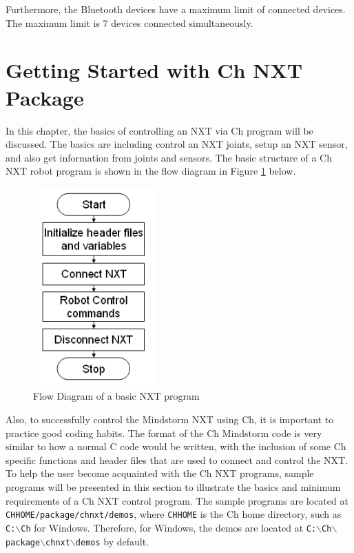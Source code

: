 \documentclass[11pt]{article}
\begin{document}
Furthermore, the Bluetooth devices have a maximum limit of connected devices. The maximum limit is 7 devices connected 
simultaneously.

\newpage
\section{Getting Started with Ch NXT Package}
In this chapter, the basics of controlling an NXT via Ch program will be discussed. The basics are including
control an NXT joints, setup an NXT sensor, and also get information from joints and sensors. The basic structure 
of a Ch NXT robot program is shown in the flow diagram in Figure \ref{fig_NXT_pstruc} below.\\

\begin{figure}[h!]
  \begin{center}
    \includegraphics[height=3in]{figure/mindstorm/NXT_pstruc.png}
    \caption{Flow Diagram of a basic NXT program\label{fig_NXT_pstruc}}
  \end{center}
\end{figure}

Also, to successfully control the Mindstorm NXT using Ch, it is important to practice good coding habits. 
The format of the Ch Mindstorm code is very similar to how a normal C code would be written, with the
inclusion of some Ch specific functions and header files that are used to connect and control the NXT. To 
help the user become acquainted with the Ch NXT programs, sample programs will be presented in this 
section to illustrate the basics and minimum requirements of a Ch NXT control program. The sample programs
are located at \texttt{CHHOME/package/chnxt/demos}, where \texttt{CHHOME} is the Ch home directory, such as
\texttt{C:$\backslash$Ch} for Windows. Therefore, for Windows, the demos are located at 
\texttt{C:$\backslash$Ch$\backslash$package$\backslash$chnxt$\backslash$demos} by default.
\end{document}
